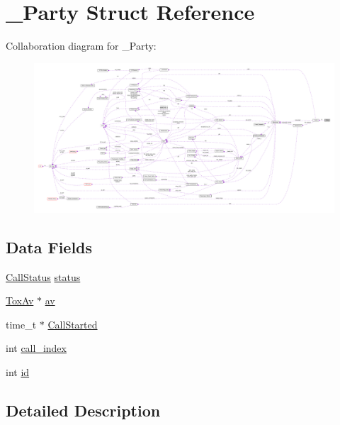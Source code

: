 \hypertarget{struct___party}{\section{\+\_\+\+Party Struct Reference}
\label{struct___party}
}


Collaboration diagram for \+\_\+\+Party\+:
\nopagebreak
\begin{figure}[H]
\begin{center}
\leavevmode
\includegraphics[width=350pt]{d2/ddc/struct___party__coll__graph}
\end{center}
\end{figure}
\subsection*{Data Fields}
\begin{DoxyCompactItemize}
\item 
\hyperlink{toxav__basic__test_8c_a377e0aa60b93038e3e9bc14c57b3d87a}{Call\+Status} \hyperlink{struct___party_a722fcd2c2e22cc6de0a53383e5871290}{status}
\item 
\hyperlink{toxav_8h_abdf4715f7de98af6ebe4c599cad42908}{Tox\+Av} $\ast$ \hyperlink{struct___party_abcfe1d5431cfdb232964a0a3380f4e7e}{av}
\item 
time\+\_\+t $\ast$ \hyperlink{struct___party_a1695e5be04a1b45020f50e3a42d0e50c}{Call\+Started}
\item 
int \hyperlink{struct___party_a80d8424fa1a3824067bbf99be2b3b0c4}{call\+\_\+index}
\item 
int \hyperlink{struct___party_a7441ef0865bcb3db9b8064dd7375c1ea}{id}
\end{DoxyCompactItemize}


\subsection{Detailed Description}


